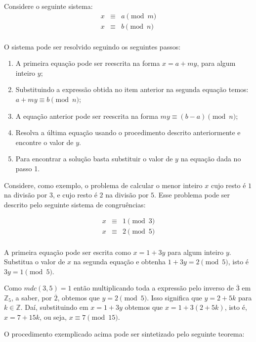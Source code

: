 Considere o seguinte sistema:
\[
\begin{array}{ccc}
	x & \equiv & a \pmod{m}\\
	x & \equiv & b \pmod{n}\\
\end{array}
\]

O sistema pode ser resolvido seguindo os seguintes passos:
\begin{enumerate}
	\item A primeira equa\c{c}\~{a}o pode ser reescrita na forma $x=a+my$, para algum inteiro $y$;
	\item Substituindo a express\~{a}o obtida no item anterior na segunda equa\c{c}\~{a}o temos: $a+my\equiv b \pmod{n}$;
	\item A equa\c{c}\~{a}o anterior pode ser reescrita na forma $my\equiv (b-a) \pmod{n}$;
	\item Resolva a \'{u}ltima equa\c{c}\~{a}o usando o procedimento descrito anteriormente e encontre o valor de $y$.
	\item Para encontrar a solu\c{c}\~{a}o basta substituir o valor de $y$ na equa\c{c}\~{a}o dada no passo 1. 
\end{enumerate}

Considere, como exemplo, o problema de calcular o menor inteiro $x$ cujo resto \'{e} $1$ na divis\~ao por $3$, 
e cujo resto \'{e} $2$ na divis\~ao por $5$. Esse problema pode ser descrito pelo seguinte sistema de congru\^encias:

\[
\begin{array}{ccc}
x & \equiv & 1\pmod{3} \\
x & \equiv & 2 \pmod{5}\\
\end{array}
\]

A primeira equa\c{c}\~{a}o pode ser escrita como $x=1+3y$ para algum inteiro $y$. Substitua o valor de $x$ na segunda 
equa\c{c}\~{a}o e obtenha $1+3y=2\pmod{5}$, isto \'{e} $3y=1\pmod{5}$. 

Como $mdc(3,5)=1$ ent\~{a}o multiplicando toda a express\~{a}o pelo inverso de $\overline{3}$ em $\mathbb{Z}_{5}$, a saber, 
por $\overline{2}$, obtemos que $y=2\pmod{5}$. Isso significa que $y=2+5k$ para $k\in\mathbb{Z}$.  
Da\'{i}, substituindo em $x=1+3y$ obtemos que $x=1+3(2+5k)$, isto \'{e}, $x=7+15k$, ou seja, $x\equiv 7\pmod{15}$.  

O procedimento exemplicado acima pode ser sintetizado pelo seguinte teorema:

